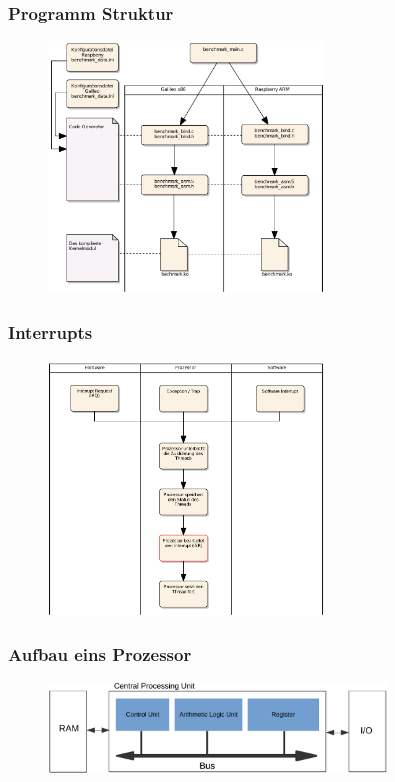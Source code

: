 \documentclass{beamer}
\begin{document}
\begin{frame}
\frametitle{Programm Struktur}
\begin{figure}[H]
\centering
\includegraphics[width=0.65\textwidth]{../thesis/images/filestructure.pdf}
\end{figure}
\end{frame}

\begin{frame}
\frametitle{Interrupts}
\begin{figure}[H]
\centering
\includegraphics[width=0.65\textwidth]{../thesis/images/interrupt_ea.pdf}
\end{figure}
\end{frame}


\begin{frame}
\frametitle{Aufbau eins Prozessor}
\begin{figure}[H]
\centering
\includegraphics[width=0.8\textwidth]{../thesis/images/cpu.pdf}
\end{figure}
\end{frame}
\end{document}
